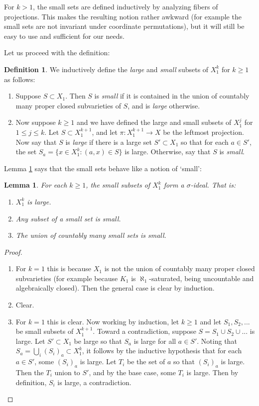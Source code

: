 \documentclass{amsart}
\newtheorem{lemma}[theorem]{Lemma}
\theoremstyle{definition}
\newtheorem{definition}[theorem]{Definition}
\begin{document}
For $k>1$, the small sets are defined inductively by analyzing fibers of projections. This makes the resulting notion rather awkward (for example the small sets are not invariant under coordinate permutations), but it will still be easy to use and sufficient for our needs.

Let us proceed with the definition:

\begin{definition}
    We inductively define the \textit{large} and \textit{small} subsets of $X_1^k$ for $k\geq 1$ as follows:
    \begin{enumerate}
        \item Suppose $S\subset X_1$. Then $S$ is \textit{small} if it is contained in the union of countably many proper closed subvarieties of $S$, and is \textit{large} otherwise.
        \item Now suppose $k\geq 1$ and we have defined the large and small subsets of $X_1^j$ for $1\leq j\leq k$. Let $S\subset X_1^{k+1}$, and let $\pi:X_1^{k+1}\rightarrow X$ be the leftmost projection. Now say that $S$ is \textit{large} if there is a large set $S'\subset X_1$ so that for each $a\in S'$, the set $S_a=\{x\in X_1^k:(a,x)\in S\}$ is large. Otherwise, say that $S$ is \textit{small}.
    \end{enumerate}
\end{definition}

Lemma \ref{L: sigma ideal} says that the small sets behave like a notion of `small':

\begin{lemma}\label{L: sigma ideal}
    For each $k\geq 1$, the small subsets of $X_1^k$ form a $\sigma$-ideal. That is:
    \begin{enumerate}
    \item $X_1^k$ is large.
    \item Any subset of a small set is small.
    \item The union of countably many small sets is small.
    \end{enumerate}   
\end{lemma}
\begin{proof}
\begin{enumerate}
    \item For $k=1$ this is because $X_1$ is not the union of countably many proper closed subvarieties (for example because $K_1$ is $\aleph_1$-saturated, being uncountable and algebraically closed). Then the general case is clear by induction.
    \item Clear.
    \item For $k=1$ this is clear. Now working by induction, let $k\geq 1$ and let $S_1,S_2,...$ be small subsets of $X_1^{k+1}$. Toward a contradiction, suppose $S=S_1\cup S_2\cup...$ is large. Let $S'\subset X_1$ be large so that $S_a$ is large for all $a\in S'$. Noting that $S_a=\bigcup_i(S_i)_a\subset X_1^k$, it follows by the inductive hypothesis that for each $a\in S'$, some $(S_i)_a$ is large. Let $T_i$ be the set of $a$ so that $(S_i)_a$ is large. Then the $T_i$ union to $S'$, and by the base case, some $T_i$ is large. Then by definition, $S_i$ is large, a contradiction.
\end{enumerate}
\end{proof}
\end{document}
